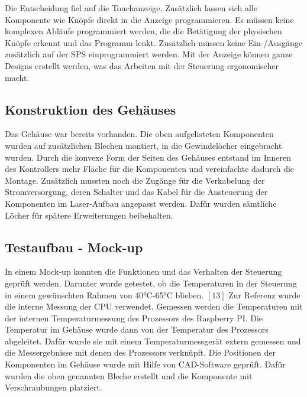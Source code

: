 Die Entscheidung fiel auf die Touchanzeige. Zusätzlich lassen sich alle Komponente wie Knöpfe direkt in die Anzeige programmieren. Es müssen keine komplexen Abläufe programmiert werden, die die Betätigung der physischen Knöpfe erkennt und das Programm lenkt. Zusätzlich müssen keine Ein-/Ausgänge zusätzlich auf der SPS einprogrammiert werden. Mit der Anzeige können ganze Designs erstellt werden, was das Arbeiten mit der Steuerung ergonomischer macht.

\subsection{Konstruktion des Gehäuses}
Das Gehäuse war bereits vorhanden. Die oben aufgelisteten Komponenten wurden auf zusätzlichen Blechen montiert, in die Gewindelöcher eingebracht wurden. Durch die konvexe Form der Seiten des Gehäuses entstand im Inneren des Kontrollers mehr Fläche für die Komponenten und vereinfachte dadurch die Montage. Zusätzlich mussten noch die Zugänge für die Verkabelung der Stromversorgung, deren Schalter und das Kabel für die Ansteuerung der Komponenten im Laser-Aufbau angepasst werden. Dafür wurden sämtliche Löcher für spätere Erweiterungen beibehalten.

\subsection{Testaufbau - Mock-up}
In einem Mock-up konnten die Funktionen und das Verhalten der Steuerung geprüft werden. Darunter wurde getestet, ob die Temperaturen in der Steuerung in einem gewünschten Rahmen von 40°C-65°C blieben. $[13]$ Zur Referenz wurde die interne Messung der CPU verwendet. Gemessen werden die Temperaturen mit der internen Temperaturmessung des Prozessors des Raspberry PI. Die Temperatur im Gehäuse wurde dann von der Temperatur des Prozessors abgeleitet. Dafür wurde sie mit einem Temperaturmessgerät extern gemessen und die Messergebnisse mit denen des Prozessors verknüpft.
Die Positionen der Komponenten im Gehäuse wurde mit Hilfe von CAD-Software geprüft. Dafür wurden die oben genannten Bleche erstellt und die Komponente mit Verschraubungen platziert.